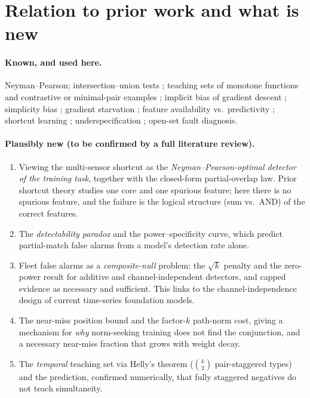 \documentclass[11pt]{article}
\theoremstyle{definition}
\theoremstyle{remark}
\newcommand{\1}{\mathbf{1}}
\begin{document}
\section{Relation to prior work and what is new}
\paragraph{Known, and used here.} Neyman--Pearson; intersection--union tests \citep{berger1982}; teaching sets of monotone functions \citep{goldman1995} and contrastive or minimal-pair examples \citep{mansouri2025}; implicit bias of gradient descent \citep{soudry2018,lyu2020,ji2020,lyu2021}; simplicity bias \citep{shah2020,morwani2023}; gradient starvation \citep{pezeshki2021}; feature availability vs.\ predictivity \citep{hermann2024}; shortcut learning \citep{geirhos2020}; underspecification \citep{damour2022}; open-set fault diagnosis.

\paragraph{Plausibly new (to be confirmed by a full literature review).}
\begin{enumerate}[leftmargin=*]
\item Viewing the multi-sensor shortcut as the \emph{Neyman--Pearson-optimal detector of the training task}, together with the closed-form partial-overlap law. Prior shortcut theory studies one core and one spurious feature; here there is no spurious feature, and the failure is the logical structure (sum vs.\ AND) of the correct features.
\item The \emph{detectability paradox} and the power--specificity curve, which predict partial-match false alarms from a model's detection rate alone.
\item Fleet false alarms as a \emph{composite-null} problem: the $\sqrt k$ penalty and the zero-power result for additive and channel-independent detectors, and capped evidence as necessary and sufficient. This links to the channel-independence design of current time-series foundation models.
\item The near-miss position bound and the factor-$k$ path-norm cost, giving a mechanism for \emph{why} norm-seeking training does not find the conjunction, and a necessary near-miss fraction that grows with weight decay.
\item The \emph{temporal} teaching set via Helly's theorem ($\binom k2$ pair-staggered types) and the prediction, confirmed numerically, that fully staggered negatives do not teach simultaneity.
\end{enumerate}
\end{document}
